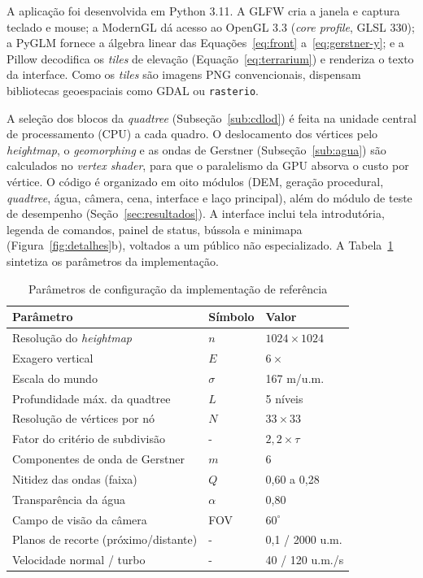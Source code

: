 \documentclass[conference]{IEEEtran}
\newcommand{\fonte}[1]{\par\vspace{2pt}{\footnotesize Fonte: #1\par}}
\begin{document}
A aplicação foi desenvolvida em Python 3.11. A GLFW cria a janela e captura
teclado e mouse; a ModernGL dá acesso ao OpenGL 3.3 (\emph{core profile},
GLSL 330); a PyGLM fornece a álgebra linear das
Equações~\eqref{eq:front} a~\eqref{eq:gerstner-y}; e a Pillow decodifica os
\emph{tiles} de elevação (Equação~\eqref{eq:terrarium}) e renderiza o texto da
interface. Como os \emph{tiles} são imagens PNG convencionais, dispensam
bibliotecas geoespaciais como GDAL ou \texttt{rasterio}.

A seleção dos blocos da \emph{quadtree} (Subseção~\ref{sub:cdlod}) é feita
na unidade central de processamento (CPU) a cada quadro. O deslocamento dos
vértices pelo \emph{heightmap}, o \emph{geomorphing} e as ondas de Gerstner
(Subseção~\ref{sub:agua}) são calculados no \emph{vertex shader}, para que o
paralelismo da GPU absorva o custo por vértice. O código é organizado em
oito módulos (DEM, geração procedural, \emph{quadtree}, água, câmera, cena,
interface e laço principal), além do módulo de teste de desempenho
(Seção~\ref{sec:resultados}). A interface inclui tela introdutória, legenda
de comandos, painel de status, bússola e minimapa
(Figura~\ref{fig:detalhes}b), voltados a um público não especializado. A
Tabela~\ref{tab:parametros} sintetiza os parâmetros da implementação.

\begin{table}[t]
\caption{Parâmetros de configuração da implementação de referência}
\label{tab:parametros}
\centering
\begin{tabular}{@{}p{3.1cm}p{0.9cm}p{2.4cm}@{}}
\toprule
\textbf{Parâmetro} & \textbf{Símbolo} & \textbf{Valor} \\
\midrule
Resolução do \emph{heightmap} & $n$ & $1024 \times 1024$ \\
Exagero vertical & $E$ & $6\times$ \\
Escala do mundo & $\sigma$ & 167 m/u.m. \\
Profundidade máx. da quadtree & $L$ & 5 níveis \\
Resolução de vértices por nó & $N$ & $33 \times 33$ \\
Fator do critério de subdivisão & - & $2{,}2 \times \tau$ \\
Componentes de onda de Gerstner & $m$ & 6 \\
Nitidez das ondas (faixa) & $Q$ & 0,60 a 0,28 \\
Transparência da água & $\alpha$ & 0,80 \\
Campo de visão da câmera & FOV & $60^{\circ}$ \\
Planos de recorte (próximo/distante) & - & 0,1 / 2000 u.m. \\
Velocidade normal / turbo & - & 40 / 120 u.m./s \\
\bottomrule
\end{tabular}
\fonte{Elaborado pelos autores (2026), com base no código-fonte da implementação.}
\end{table}
\end{document}

